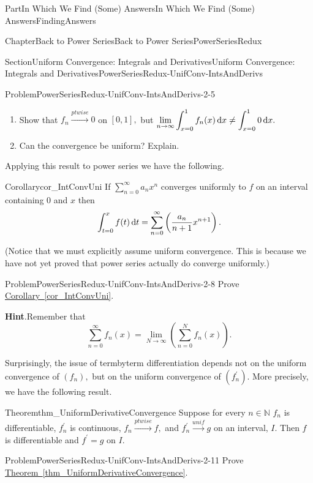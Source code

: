 \documentclass[oneside,10pt,]{book}
\newcommand{\blocktitlefont}{\relax}
\newcommand{\xreffont}{\relax}
\numberwithin{equation}{part}
\newcommand{\dx}[1]{\,{\rm d}#1}
\def\limit#1#2#3{{\displaystyle\lim_{#1\rightarrow #2}#3}}
\newcommand{\unif}{\stackrel{unif}{\longrightarrow}}
\newcommand{\ptwise}{\stackrel{ptwise}{\longrightarrow}}
\newcommand{\NN}{\mathbb {N}}
\begin{document}
\begin{partptx}{Part}{In Which We Find (Some) Answers}{}{In Which We Find (Some) Answers}{}{}{FindingAnswers}
\begin{chapterptx}{Chapter}{Back to Power Series}{}{Back to Power Series}{}{}{PowerSeriesRedux}
\begin{sectionptx}{Section}{Uniform Convergence: Integrals and Derivatives}{}{Uniform Convergence: Integrals and Derivatives}{}{}{PowerSeriesRedux-UnifConv-IntsAndDerivs}
\begin{introduction}{}
\begin{problem}{Problem}{}{PowerSeriesRedux-UnifConv-IntsAndDerivs-2-5}
\begin{enumerate}[label={(\alph*)}]
\item{}Show that \(f_n\ptwise 0\) on \([0,1],\) but \(\limit{n}{\infty}{\int_{x=0}^1f_n(x)\dx{
x}\neq\int_{x=0}^10\dx{ x}.}\)%
\item{}Can the convergence be uniform?  Explain.%
\end{enumerate}
%
\end{problem}
Applying this result to power series we have the following.%
\begin{corollary}{Corollary}{}{}{cor_IntConvUni}%
If \(\sum_{n=0}^\infty a_nx^n\) converges uniformly to \(f\) on an interval containing \(0\) and \(x\) then%
\begin{equation*}
\int_{t=0}^xf(t)\dx{
t}=\sum_{n=0}^\infty\left(\frac{a_n}{n+1}x^{n+1}\right)\text{.}
\end{equation*}
%
\par
(Notice that we must explicitly assume uniform convergence. This is because we have not yet proved that power series actually do converge uniformly.)%
\end{corollary}
\begin{problem}{Problem}{}{PowerSeriesRedux-UnifConv-IntsAndDerivs-2-8}%
Prove \hyperref[cor_IntConvUni]{Corollary~{\xreffont\ref{cor_IntConvUni}}}.%
\par\smallskip%
\noindent\textbf{\blocktitlefont Hint}.\hypertarget{PowerSeriesRedux-UnifConv-IntsAndDerivs-2-8-3}{}\quad{}Remember that%
\begin{equation*}
\displaystyle \sum_{n=0}^\infty f_n(x) =
\limit{N}{\infty}{\left(\sum_{n=0}^N f_n(x)\right)}.
\end{equation*}
%
\end{problem}
Surprisingly, the issue of term\textendash{}by\textendash{}term differentiation depends not on the uniform convergence of \(\left(f_n\right),\) but on the uniform convergence of \(\left(f^\prime_n\right)\).  More precisely, we have the following result.%
\begin{theorem}{Theorem}{}{}{thm_UniformDerivativeConvergence}%
%
%
Suppose for every \(n\in\NN\) \(f_n\) is differentiable, \(f_n^\prime\) is continuous, \(f_n\ptwise f,\) and \(f_n^\prime\unif g\) on an interval, \(I\).  Then \(f\) is differentiable and \(f^\prime = g\) on \(I\).%
\end{theorem}
\begin{problem}{Problem}{}{PowerSeriesRedux-UnifConv-IntsAndDerivs-2-11}%
Prove \hyperref[thm_UniformDerivativeConvergence]{Theorem~{\xreffont\ref{thm_UniformDerivativeConvergence}}}.%

\end{problem}
\end{introduction}
\end{sectionptx}
\end{chapterptx}
\end{partptx}
\end{document}
